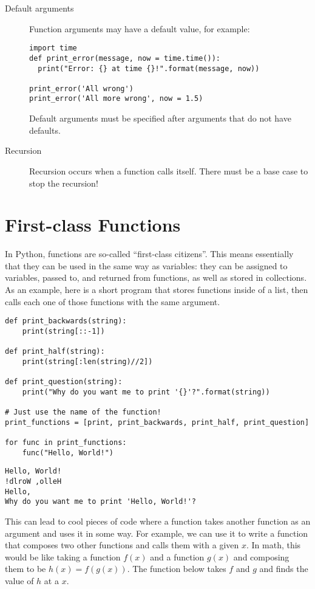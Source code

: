 \documentclass[11pt]{cselabheader}
\begin{document}
\begin{description}
\item[Default arguments] Function arguments may have a default value, for
    example:
    \begin{lstlisting}[style=python]
import time
def print_error(message, now = time.time()):
  print("Error: {} at time {}!".format(message, now))

print_error('All wrong')
print_error('All more wrong', now = 1.5)
    \end{lstlisting}

    Default arguments must be specified after arguments that do not have
    defaults.

  \item[Recursion] Recursion occurs when a function calls itself. There must be
    a base case to stop the recursion!
\end{description}

\pagebreak
\section{First-class Functions}
\label{subsec:first}
In Python, functions are so-called ``first-class citizens''. This means
essentially that they can be used in the same way as variables: they can be
assigned to variables, passed to, and returned from functions, as well as stored
in collections. As an example, here is a short program that stores functions
inside of a list, then calls each one of those functions with the same argument.

\begin{lstlisting}[style=python]
def print_backwards(string):
    print(string[::-1])

def print_half(string):
    print(string[:len(string)//2])

def print_question(string):
    print("Why do you want me to print '{}'?".format(string))

# Just use the name of the function!
print_functions = [print, print_backwards, print_half, print_question]

for func in print_functions:
    func("Hello, World!")
\end{lstlisting}

\begin{lstlisting}[style=bash]
Hello, World!
!dlroW ,olleH
Hello,
Why do you want me to print 'Hello, World!'?
\end{lstlisting}

This can lead to cool pieces of code where a function takes another function as
an argument and uses it in some way. For example, we can use it to write a
function that composes two other functions and calls them with a given $x$. In
math, this would be like taking a function $f(x)$ and a function $g(x)$ and
composing them to be $h(x) = f(g(x))$. The function below takes $f$ and $g$ and
finds the value of $h$ at a $x$.
\end{document}
